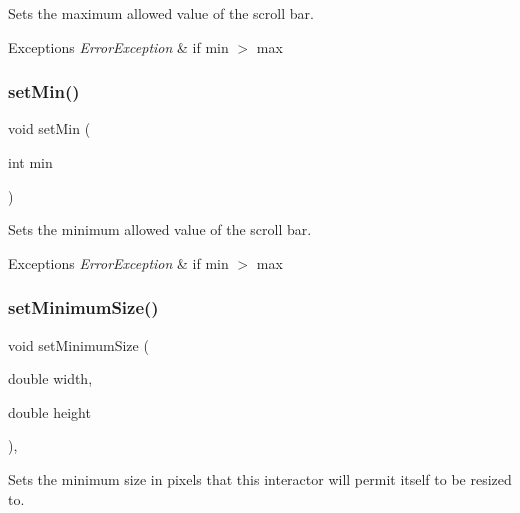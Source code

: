 Sets the maximum allowed value of the scroll bar. 


\begin{DoxyExceptions}{Exceptions}
{\em Error\+Exception} & if min $>$ max \\
\hline
\end{DoxyExceptions}
\mbox{\label{classGScrollBar_a6dc44e5adc595b71f90efc65b0b5ea1d}} 
\subsubsection{\texorpdfstring{set\+Min()}{setMin()}}
{\footnotesize\ttfamily void set\+Min (\begin{DoxyParamCaption}\item[{int}]{min }\end{DoxyParamCaption})\hspace{0.3cm}{\ttfamily [virtual]}}



Sets the minimum allowed value of the scroll bar. 


\begin{DoxyExceptions}{Exceptions}
{\em Error\+Exception} & if min $>$ max \\
\hline
\end{DoxyExceptions}
\mbox{\label{classGInteractor_a0cf428e207b7f22cc08138a90b1b87b2}} 
\subsubsection{\texorpdfstring{set\+Minimum\+Size()}{setMinimumSize()}\hspace{0.1cm}{\footnotesize\ttfamily [1/2]}}
{\footnotesize\ttfamily void set\+Minimum\+Size (\begin{DoxyParamCaption}\item[{double}]{width,  }\item[{double}]{height }\end{DoxyParamCaption})\hspace{0.3cm}{\ttfamily [virtual]}, {\ttfamily [inherited]}}



Sets the minimum size in pixels that this interactor will permit itself to be resized to. 


